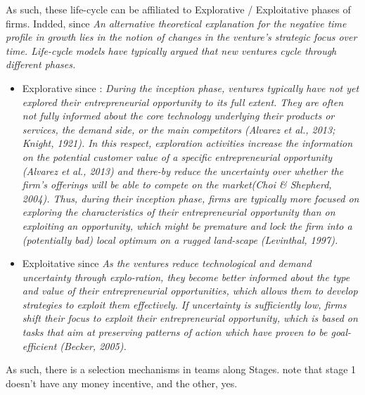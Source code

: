 \begin{itemize}
As such, these life-cycle can be affiliated to Explorative / Exploitative phases of firms. Indded, since \citet{grillitsch2020does} \textit{An alternative theoretical explanation for the negative time profile in growth lies in the notion of changes in the venture's strategic focus over time. Life-cycle models have typically argued that new ventures cycle through different phases.}
\begin{itemize}
    \item Explorative since \citet{grillitsch2020does} : \textit{During the inception phase, ventures typically have not yet explored their entrepreneurial opportunity to its full extent. They are often not fully informed about the core technology underlying their products or services, the demand side, or the main competitors (Alvarez et al., 2013; Knight, 1921). In this respect, exploration activities increase the information on the potential customer value of a specific entrepreneurial opportunity (Alvarez et al., 2013) and there-by reduce the uncertainty over whether the firm's offerings will be able to compete on the market(Choi & Shepherd, 2004). Thus, during their inception phase, firms are typically more focused on exploring the characteristics of their entrepreneurial opportunity than on exploiting an opportunity, which might be premature and lock the firm into a (potentially bad) local optimum on a rugged land-scape (Levinthal, 1997).}
    \item Exploitative since \citet{grillitsch2020does} \textit{As the ventures reduce technological and demand uncertainty through explo-ration, they become better informed about the type and value of their entrepreneurial opportunities, which allows them to develop strategies to exploit them effectively. If uncertainty is sufficiently low, firms shift their focus to exploit their entrepreneurial opportunity, which is based on tasks that aim at preserving patterns of action which have proven to be goal-efficient (Becker, 2005).}
\end{itemize}

As such, there is a selection mechanisms in teams along Stages. note that stage 1 doesn't have any money incentive, and the other, yes.


\end{itemize}

